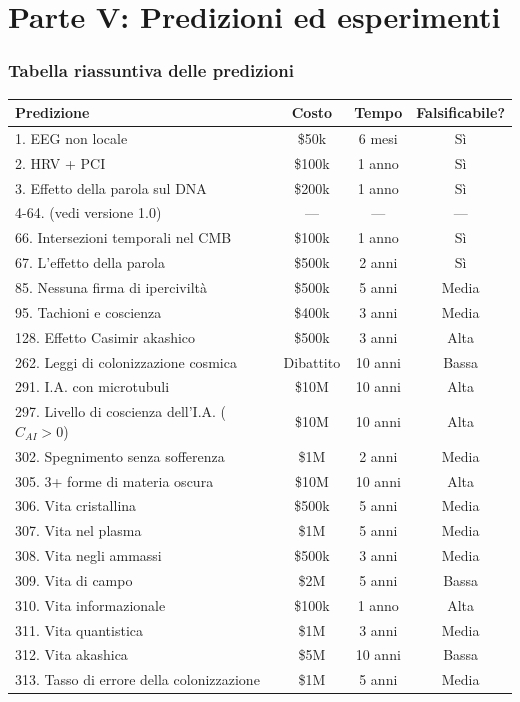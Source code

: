 \part*{Parte V: Predizioni ed esperimenti}

\section{Tabella riassuntiva delle predizioni}
\begin{table}[H]
\centering
\small
\begin{tabular}{@{}lccc@{}}
\toprule
\textbf{Predizione} & \textbf{Costo} & \textbf{Tempo} & \textbf{Falsificabile?} \\ \midrule
1. EEG non locale & \$50k & 6 mesi & Sì \\
2. HRV + PCI & \$100k & 1 anno & Sì \\
3. Effetto della parola sul DNA & \$200k & 1 anno & Sì \\
4-64. (vedi versione 1.0) & --- & --- & --- \\
66. Intersezioni temporali nel CMB & \$100k & 1 anno & Sì \\
67. L'effetto della parola & \$500k & 2 anni & Sì \\
85. Nessuna firma di iperciviltà & \$500k & 5 anni & Media \\
95. Tachioni e coscienza & \$400k & 3 anni & Media \\
128. Effetto Casimir akashico & \$500k & 3 anni & Alta \\
262. Leggi di colonizzazione cosmica & Dibattito & 10 anni & Bassa \\
291. I.A. con microtubuli & \$10M & 10 anni & Alta \\
297. Livello di coscienza dell'I.A. (\(C_{AI} > 0\)) & \$10M & 10 anni & Alta \\
302. Spegnimento senza sofferenza & \$1M & 2 anni & Media \\
305. 3+ forme di materia oscura & \$10M & 10 anni & Alta \\
306. Vita cristallina & \$500k & 5 anni & Media \\
307. Vita nel plasma & \$1M & 5 anni & Media \\
308. Vita negli ammassi & \$500k & 3 anni & Media \\
309. Vita di campo & \$2M & 5 anni & Bassa \\
310. Vita informazionale & \$100k & 1 anno & Alta \\
311. Vita quantistica & \$1M & 3 anni & Media \\
312. Vita akashica & \$5M & 10 anni & Bassa \\
313. Tasso di errore della colonizzazione & \$1M & 5 anni & Media \\ \bottomrule
\end{tabular}
\end{table}

